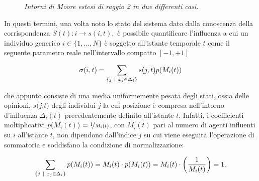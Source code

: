 \documentclass{article}
\begin{document}
\begin{figure}[h]
\centering
{}
\caption{\textit{Intorni di Moore estesi di raggio 2 in due differenti casi.}}
\label{fig:3}
\end{figure}

In questi termini, una volta noto lo stato del sistema dato dalla conoscenza della corrispondenza $S(t): i \rightarrow s(i,t), $ è possibile quantificare l'influenza a cui un individuo generico $\textit{i} \in \{1,...,\textit{N} \}$ è soggetto all'istante temporale $\textit{t}$ come il seguente parametro reale nell'intervallo compatto $[-1,+1]$

\begin{equation}
    \sigma(i,t) = \sum_{ \{ j \ | \ x_{j} \in \Delta_{i} \} } s(j, t)p(M_{i}(t))
    \medskip
    \label{Eq:1}
\end{equation}

che appunto consiste di una media uniformemente pesata degli stati, ossia delle opinioni, $\textit{s(j,t)}$ degli individui $\textit{j}$ la cui posizione è compresa nell'intorno d'influenza $\Delta_{i}(t)$ precedentemente definito all'istante $\textit{t}$. Infatti, i coefficienti moltiplicativi $\textit{p}$($M_{i}(t)$) $= \nicefrac{1}{M_{i}(t)}$, con $M_{i}(t)$ pari al numero di agenti influenti su $\textit{i}$ all'istante $\textit{t}$, non dipendono dall'indice $\textit{j}$ su cui viene eseguita l'operazione di sommatoria e soddisfano la condizione di normalizzazione:

\begin{equation}
    \sum_{ \{ j \ | \ x_{j} \in \Delta_{i} \} } p(M_{i}(t)) = M_{i}(t) \cdot p(M_{i}(t)) =    M_{i}(t) \cdot \left ( \frac{1}{M_{i}(t)} \right ) = 1.
    \medskip
    \label{Eq:2}
\end{equation}
\end{document}

